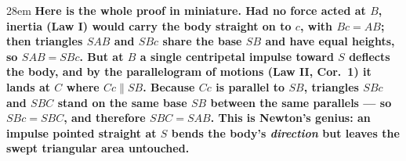 \documentclass[border=4pt]{standalone}
\begin{document}
\begin{varwidth}{28em}
\large\bfseries
Here is the whole proof in miniature. Had no force acted at $B$, inertia (\textbf{Law I}) would carry the      body straight on to $c$, with \textcolor{arearpurple}{$Bc = AB$}; then triangles $SAB$ and $SBc$ share the base      \textcolor{radigreen}{$SB$} and have equal heights, so \emph{$SAB = SBc$}. But at $B$ a single centripetal impulse toward      $S$ deflects the body, and by the parallelogram of motions (\textbf{Law II, Cor.~1}) it lands at $C$ where      \textcolor{arearpurple}{$Cc \parallel SB$}. Because $Cc$ is parallel to $SB$, triangles $SBc$ and $SBC$ stand on the same      base $SB$ between the same parallels — so \emph{$SBc = SBC$}, and therefore \emph{$SBC = SAB$}. This is      Newton's genius: an impulse pointed straight at $S$ bends the body's \emph{direction} but leaves the swept      \textcolor{arearpurple}{triangular area} untouched.
\end{varwidth}
\end{document}
